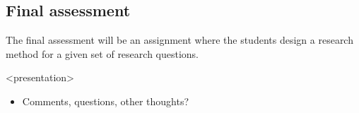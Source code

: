 \subsection{Final assessment}

The final assessment will be an assignment where the students design a research 
method for a given set of research questions.

%
%
%

\begin{frame}<presentation>
  \begin{question}
    \begin{itemize}
      \item Comments, questions, other thoughts?
    \end{itemize}
  \end{question}
\end{frame}



\begin{frame}[allowframebreaks]
\end{frame}

